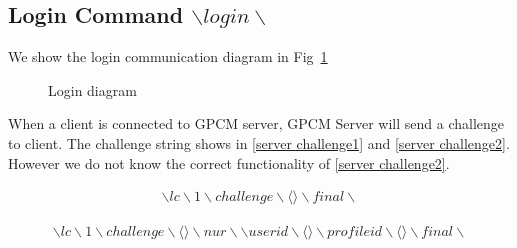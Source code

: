 \documentclass[oneside,titlepage,a4paper]{Definition/retrospy} %
\begin{document}
\subsection{Login Command $ \backslash login \backslash $}
We show the login communication diagram in Fig~\ref{Login diagram}
\begin{figure}[H]
	
\caption{Login diagram}
\label{Login diagram}
\end{figure}

When a client is connected to GPCM server, GPCM Server will send a challenge to client. The challenge string shows in \ref{server challenge1} and \ref{server challenge2}. However we do not know the correct functionality of \ref{server challenge2}.
\begin{tcolorbox}
	\begin{equation}\label{server challenge1}
	\begin{split}
	\backslash lc \backslash 1 \backslash challenge \backslash \langle \rangle \backslash final \backslash
	\end{split}
	\end{equation}
\end{tcolorbox}
\begin{tcolorbox}
	\begin{equation}\label{server challenge2}
	\begin{split}
	\backslash lc \backslash 1 \backslash challenge \backslash \langle \rangle 	\backslash nur \backslash\backslash userid \backslash \langle \rangle \backslash profileid \backslash \langle \rangle \backslash final \backslash
	\end{split}
	\end{equation}
\end{tcolorbox}
\end{document}
